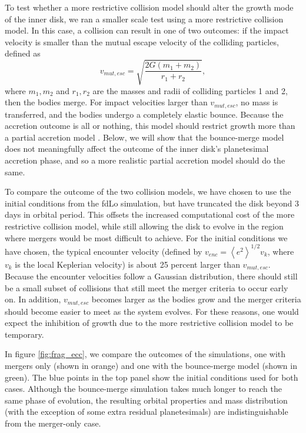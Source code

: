 \documentclass[twocolumn,linenumbers]{aastex63}
\begin{document}
To test whether a more restrictive collision model should alter the growth mode of the inner disk, we ran a smaller scale test 
using a more restrictive collision model. In this case, a collision can result in one of two outcomes: if the impact velocity is 
smaller than the mutual escape velocity of the colliding particles, defined as
\begin{equation}\label{eq:v_mut}
	v_{mut, esc} = \sqrt{\frac{2 G (m_{1} + m_{2})}{r_{1} + r_{2}}},
\end{equation}
where $m_{1}, m_{2}$ and $r_{1}, r_{2}$ are the masses and radii of
colliding particles 1 and 2, then the bodies merge. For
impact velocities larger than $v_{mut, esc}$, no mass is transferred, and the bodies undergo a completely elastic bounce. 
Because the accretion outcome is all or nothing, this model should restrict growth more than a partial accretion model 
\citep{leinhardt12}. Below, we will show that the bounce-merge model does not meaningfully affect the outcome of the inner 
disk's planetesimal accretion phase, and so a more realistic partial accretion model should do the same.

To compare the outcome of the two collision models, we have chosen to use the initial conditions from the fdLo simulation, but 
have truncated the disk beyond 3 days in orbital period. This offsets the increased computational cost of the more restrictive collision model, while still allowing the disk to evolve in the region where mergers would be most difficult to achieve.
For the initial conditions we have chosen, the typical encounter velocity (defined by $v_{enc} = \left< e^{2} \right>^{1/2} v_{k}$, 
where $v_{k}$ is the local Keplerian velocity) is about 25 percent larger than $v_{mut, esc}$. Because the encounter velocities 
follow a Gaussian distribution, there should still be a small subset of collisions that still meet the merger criteria to occur early on. 
In addition, $v_{mut, esc}$ becomes larger as the bodies grow and the merger criteria should become easier to meet as the 
system evolves. For these reasons, one would expect the inhibition of growth due to the more restrictive collision model to be 
temporary.

In figure \ref{fig:frag_ecc}, we compare the outcomes of the simulations, one with mergers only (shown in orange) and one with 
the bounce-merge model (shown in green). The blue points in the top panel show the initial conditions used for both cases. 
Although the bounce-merge simulation takes much longer to reach the same phase of evolution, the resulting orbital properties 
and mass distribution (with the exception of some extra residual planetesimals) are indistinguishable from the merger-only case.
\end{document}
